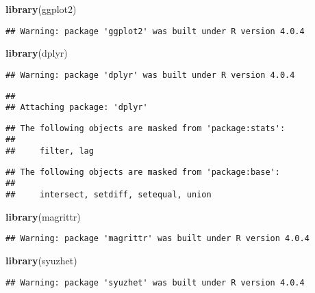 \documentclass[
]{article}
\newenvironment{Shaded}{\begin{snugshade}}{\end{snugshade}}
\newcommand{\KeywordTok}[1]{\textcolor[rgb]{0.13,0.29,0.53}{\textbf{#1}}}
\newcommand{\NormalTok}[1]{#1}
\begin{document}
\begin{Shaded}
\begin{Highlighting}[]
\KeywordTok{library}\NormalTok{(ggplot2)}
\end{Highlighting}
\end{Shaded}

\begin{verbatim}
## Warning: package 'ggplot2' was built under R version 4.0.4
\end{verbatim}

\begin{Shaded}
\begin{Highlighting}[]
\KeywordTok{library}\NormalTok{(dplyr)}
\end{Highlighting}
\end{Shaded}

\begin{verbatim}
## Warning: package 'dplyr' was built under R version 4.0.4
\end{verbatim}

\begin{verbatim}
## 
## Attaching package: 'dplyr'
\end{verbatim}

\begin{verbatim}
## The following objects are masked from 'package:stats':
## 
##     filter, lag
\end{verbatim}

\begin{verbatim}
## The following objects are masked from 'package:base':
## 
##     intersect, setdiff, setequal, union
\end{verbatim}

\begin{Shaded}
\begin{Highlighting}[]
\KeywordTok{library}\NormalTok{(magrittr)}
\end{Highlighting}
\end{Shaded}

\begin{verbatim}
## Warning: package 'magrittr' was built under R version 4.0.4
\end{verbatim}

\begin{Shaded}
\begin{Highlighting}[]
\KeywordTok{library}\NormalTok{(syuzhet)}
\end{Highlighting}
\end{Shaded}

\begin{verbatim}
## Warning: package 'syuzhet' was built under R version 4.0.4
\end{verbatim}
\end{document}
